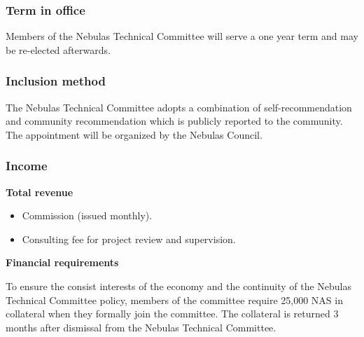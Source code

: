 \subsubsection{Term in office}

Members of the Nebulas Technical Committee will serve a one year term and may be re-elected afterwards.

\subsubsection{Inclusion method}

The Nebulas Technical Committee adopts a combination of self-recommendation and community recommendation which is publicly reported to the community. The appointment will be organized by the Nebulas Council.

\subsubsection{Income}

\textbf{Total revenue}

\begin{itemize}
	\item Commission (issued monthly).
	\item Consulting fee for project review and supervision.
\end{itemize}

\vspace{2em}

\textbf{Financial requirements}

To ensure the consist interests of the economy and the continuity of the Nebulas Technical Committee policy, members of the committee require 25,000 NAS in collateral when they formally join the committee. The collateral is returned 3 months after dismissal from the Nebulas Technical Committee.
